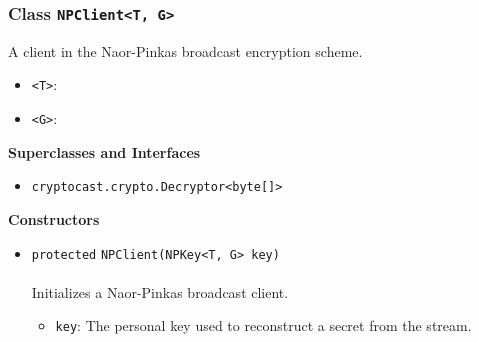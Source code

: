 \subsubsection{Class \lstinline|NPClient<T, G>|}
A client in the Naor-Pinkas broadcast encryption scheme. \\
\noindent\begin{minipage}[t]{5cm}
\vspace{0.3em}
\hspace*{2em}
\vspace{0.3em}
\end{minipage}

\begin{itemize}
\item \lstinline|<T>|: 
\item \lstinline|<G>|: 
\end{itemize}


\textbf{\sffamily Superclasses and Interfaces}
\begin{itemize}
\item \lstinline|cryptocast.crypto.Decryptor<byte[]>|
\end{itemize}


\textbf{\sffamily Constructors}
\begin{itemize}
\item \lstinline|protected| \lstinline|NPClient|\lstinline|(NPKey<T, G> key)|\\ \\[-0.6em]
Initializes a Naor-Pinkas broadcast client.
\begin{itemize}
\item \lstinline|key|: The personal key used to reconstruct a secret from the stream.
\end{itemize}



\end{itemize}


